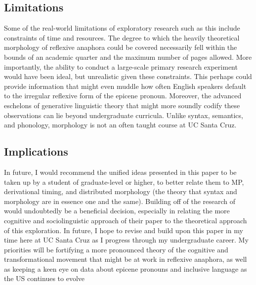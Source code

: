 \documentclass{article}
\begin{document}
\subsection{Limitations}
Some of the real-world limitations of exploratory research such as this include constraints of time and resources. The degree to which the heavily theoretical morphology of reflexive anaphora could be covered necessarily fell within the bounds of an academic quarter and the maximum number of pages allowed. More importantly, the ability to conduct a large-scale primary research experiment would have been ideal, but unrealistic given these constraints. This perhaps could provide information that might even muddle how often English speakers default to the irregular reflexive form of the epicene pronoun. Moreover, the advanced eschelons of generative linguistic theory that might more soundly codify these observations can lie beyond undergraduate curricula. Unlike syntax, semantics, and phonology, morphology is not an often taught course at UC Santa Cruz.

\subsection{Implications}
In future, I would recommend the unified ideas presented in this paper to be taken up by a student of graduate-level or higher, to better relate them to MP, derivational timing, and distributed morphology (the theory that syntax and morphology are in essence one and the same). Building off of the research of \citet{Arnold21} would undoubtedly be a beneficial decision, especially in relating the more cognitive and sociolinguistic approach of their paper to the theoretical approach of this exploration. In future, I hope to revise and build upon this paper in my time here at UC Santa Cruz as I progress through my undergraduate career. My priorities will be fortifying a more pronounced theory of the cognitive and transformational movement that might be at work in reflexive anaphora, as well as keeping a keen eye on data about epicene pronouns and inclusive language as the US continues to evolve
\end{document}
